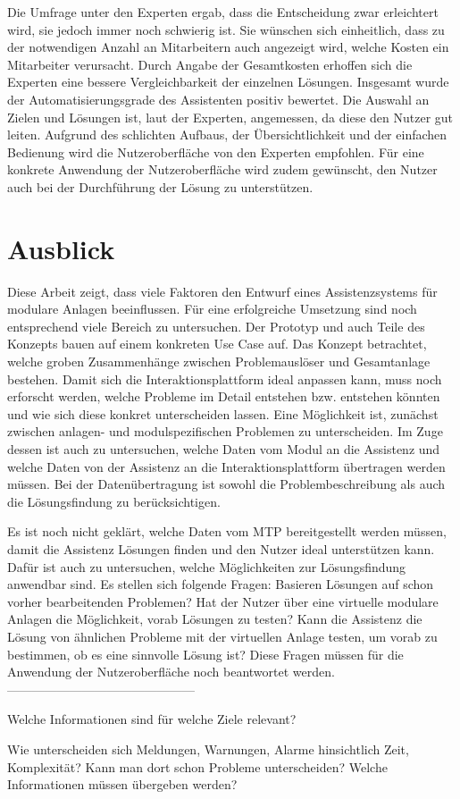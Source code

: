 Die Umfrage unter den Experten ergab, dass die Entscheidung zwar erleichtert wird, sie jedoch immer noch schwierig ist. Sie wünschen sich einheitlich, dass zu der notwendigen Anzahl an Mitarbeitern auch angezeigt wird, welche Kosten ein Mitarbeiter verursacht. Durch Angabe der Gesamtkosten erhoffen sich die Experten eine bessere Vergleichbarkeit der einzelnen Lösungen. Insgesamt wurde der Automatisierungsgrade des Assistenten positiv bewertet. Die Auswahl an Zielen und Lösungen ist, laut der Experten, angemessen, da diese den Nutzer gut leiten. Aufgrund des schlichten Aufbaus, der Übersichtlichkeit und der einfachen Bedienung wird die Nutzeroberfläche von den Experten empfohlen. Für eine konkrete Anwendung der Nutzeroberfläche wird zudem gewünscht, den Nutzer auch bei der Durchführung der Lösung zu unterstützen.

\section{Ausblick}
Diese Arbeit zeigt, dass viele Faktoren den Entwurf eines Assistenzsystems für modulare Anlagen beeinflussen. Für eine erfolgreiche Umsetzung sind noch entsprechend viele Bereich zu untersuchen. Der Prototyp und auch Teile des Konzepts bauen auf einem konkreten Use Case auf. Das Konzept betrachtet, welche groben Zusammenhänge zwischen Problemauslöser und Gesamtanlage bestehen. Damit sich die Interaktionsplattform ideal anpassen kann, muss noch erforscht werden, welche Probleme im Detail entstehen bzw. entstehen könnten und wie sich diese konkret unterscheiden lassen. Eine Möglichkeit ist, zunächst zwischen anlagen- und modulspezifischen Problemen zu unterscheiden. Im Zuge dessen ist auch zu untersuchen, welche Daten vom Modul an die Assistenz und welche Daten von der Assistenz an die Interaktionsplattform übertragen werden müssen. Bei der Datenübertragung ist sowohl die Problembeschreibung als auch die Lösungsfindung zu berücksichtigen. 

Es ist noch nicht geklärt, welche Daten vom MTP bereitgestellt werden müssen, damit die Assistenz Lösungen finden und den Nutzer ideal unterstützen kann. Dafür ist auch zu untersuchen, welche Möglichkeiten zur Lösungsfindung anwendbar sind. Es stellen sich folgende Fragen: Basieren Lösungen auf schon vorher bearbeitenden Problemen? Hat der Nutzer über eine virtuelle modulare Anlagen die Möglichkeit, vorab Lösungen zu testen? Kann die Assistenz die Lösung von ähnlichen Probleme mit der virtuellen Anlage testen, um vorab zu bestimmen, ob es eine sinnvolle Lösung ist? Diese Fragen müssen für die Anwendung der Nutzeroberfläche noch beantwortet werden.
---------------------------------------------

Welche Informationen sind für welche Ziele relevant?

Wie unterscheiden sich Meldungen, Warnungen, Alarme hinsichtlich Zeit, Komplexität? Kann man dort schon Probleme unterscheiden? Welche Informationen müssen übergeben werden?


